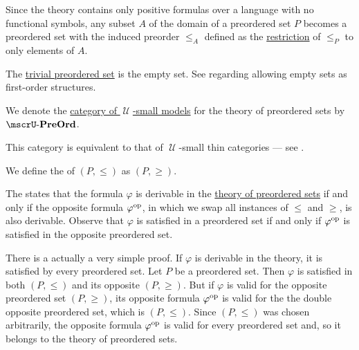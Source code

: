 \begin{definition}
\begin{thmenum}
     Since the theory contains only positive formulas over a language with no functional symbols, any subset \( A \) of the domain of a preordered set \( P \) becomes a preordered set with the induced preorder \( \leq_A \) defined as the \hyperref[def:binary_relation/restriction]{restriction} of \( \leq_P \) to only elements of \( A \).

     The \hyperref[thm:substructures_form_complete_lattice/bottom]{trivial preordered set} is the empty set. See  regarding allowing empty sets as first-order structures.

      We denote the \hyperref[def:category_of_small_first_order_models]{category of \( \mscrU \)-small models} for the theory of preordered sets by \( \ucat{PreOrd} \).

    This category is equivalent to that of \( \mscrU \)-small thin categories --- see .

     We define the  of \( (P, \leq) \) as \( (P, \geq) \).

    The  states that the formula \( \varphi \) is derivable in the \hyperref[def:preordered_set/theory]{theory of preordered sets} if and only if the opposite formula \( \varphi^{\operatorname{op}} \), in which we swap all instances of \( \leq \) and \( \geq \), is also derivable. Observe that \( \varphi \) is satisfied in a preordered set if and only if \( \varphi^{\operatorname{op}} \) is satisfied in the opposite preordered set.

    There is a actually a very simple proof. If \( \varphi \) is derivable in the theory, it is satisfied by every preordered set. Let \( P \) be a preordered set. Then \( \varphi \) is satisfied in both \( (P, \leq) \) and its opposite \( (P, \geq) \). But if \( \varphi \) is valid for the opposite preordered set \( (P, \geq) \), its opposite formula \( \varphi^{\operatorname{op}} \) is valid for the the double opposite preordered set, which is \( (P, \leq) \). Since \( (P, \leq) \) was chosen arbitrarily, the opposite formula \( \varphi^{\operatorname{op}} \) is valid for every preordered set and, so it belongs to the theory of preordered sets.


\end{thmenum}
\end{definition}
